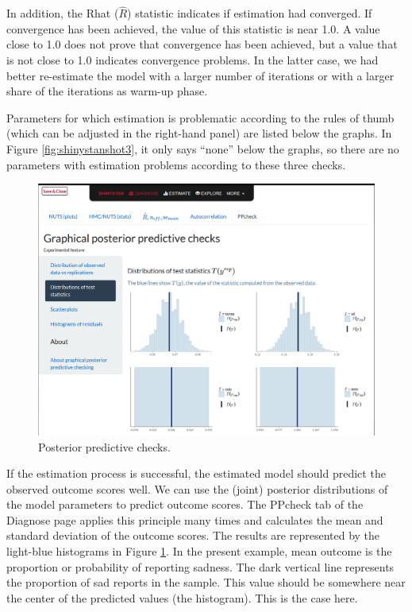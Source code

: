 \documentclass[
  english,
  doc]{apa6}
\begin{document}
In addition, the Rhat (\(\hat{R}\)) statistic indicates if estimation had converged. If convergence has been achieved, the value of this statistic is near 1.0. A value close to 1.0 does not prove that convergence has been achieved, but a value that is not close to 1.0 indicates convergence problems. In the latter case, we had better re-estimate the model with a larger number of iterations or with a larger share of the iterations as warm-up phase.

Parameters for which estimation is problematic according to the rules of thumb (which can be adjusted in the right-hand panel) are listed below the graphs. In Figure \ref{fig:shinystanshot3}, it only says ``none'' below the graphs, so there are no parameters with estimation problems according to these three checks.

\begin{figure}[H]
\includegraphics[width=1\linewidth]{shinystan4} \caption{Posterior predictive checks.}\label{fig:shinystanshot4}
\end{figure}

If the estimation process is successful, the estimated model should predict the observed outcome scores well. We can use the (joint) posterior distributions of the model parameters to predict outcome scores. The PPcheck tab of the Diagnose page applies this principle many times and calculates the mean and standard deviation of the outcome scores. The results are represented by the light-blue histograms in Figure \ref{fig:shinystanshot4}. In the present example, mean outcome is the proportion or probability of reporting sadness. The dark vertical line represents the proportion of sad reports in the sample. This value should be somewhere near the center of the predicted values (the histogram). This is the case here.
\end{document}
